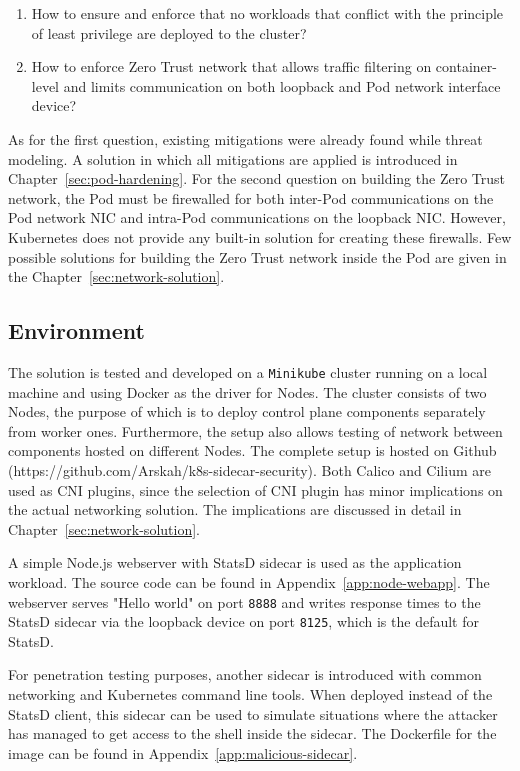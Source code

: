 \documentclass[english, 12pt, a4paper, sci, utf8, a-2b, online]{aaltothesis}
\begin{document}
\begin{enumerate}
  \item How to ensure and enforce that no workloads that conflict with the principle of least privilege are deployed to the cluster?
  \item How to enforce Zero Trust network that allows traffic filtering on container-level and limits communication on both loopback and Pod network interface device?
\end{enumerate}

As for the first question, existing mitigations were already found while threat modeling.
A solution in which all mitigations are applied is introduced in Chapter~\ref{sec:pod-hardening}.
For the second question on building the Zero Trust network, the Pod must be firewalled for both inter-Pod communications on the Pod network NIC and intra-Pod communications on the loopback NIC.
However, Kubernetes does not provide any built-in solution for creating these firewalls.
Few possible solutions for building the Zero Trust network inside the Pod are given in the Chapter~\ref{sec:network-solution}.

\subsection{Environment}

The solution is tested and developed on a \texttt{Minikube} cluster running on a local machine and using Docker as the driver for Nodes.
The cluster consists of two Nodes, the purpose of which is to deploy control plane components separately from worker ones.
Furthermore, the setup also allows testing of network between components hosted on different Nodes.
The complete setup is hosted on Github (https://github.com/Arskah/k8s-sidecar-security).
Both Calico and Cilium are used as CNI plugins, since the selection of CNI plugin has minor implications on the actual networking solution.
The implications are discussed in detail in Chapter~\ref{sec:network-solution}.

A simple Node.js webserver with StatsD sidecar is used as the application workload.
The source code can be found in Appendix~\ref{app:node-webapp}.
The webserver serves "Hello world" on port \texttt{8888} and writes response times to the StatsD sidecar via the loopback device on port \texttt{8125}, which is the default for StatsD.

For penetration testing purposes, another sidecar is introduced with common networking and Kubernetes command line tools.
When deployed instead of the StatsD client, this sidecar can be used to simulate situations where the attacker has managed to get access to the shell inside the sidecar.
The Dockerfile for the image can be found in Appendix~\ref{app:malicious-sidecar}.
\end{document}
